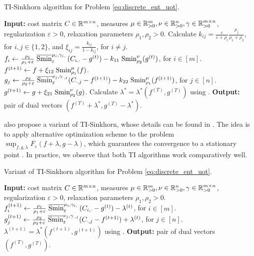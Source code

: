 \begin{algorithm}[t]
  \caption{TI-Sinkhorn algorithm for Problem \ref{eq:discrete_ent_uot}.}
  \label{alg:TI_Sinkhorn}
\begin{algorithmic}[1]
  \STATE \textbf{Input:} cost matrix $C \in \mathbb R^{m \times n}$,
  measures $\mu \in \mathbb R^m_{> 0}, \nu \in \mathbb R^n_{> 0}, \gamma \in \mathbb R^{m \times n}_{> 0}$,
  regularization $\varepsilon > 0$, relaxation parameters $\rho_1, \rho_2 > 0$.
  \STATE Calculate $k_{ij} = \frac{\varepsilon}{\varepsilon + \rho_i} \frac{\rho_j}{\rho_1 + \rho_2}$,
  for $i, j \in \{ 1, 2\}$, and $\xi_{ij} = \frac{k_{ij}}{1 - k_{ij}}$, for $i \neq j$.
  \STATE $f_i \gets \frac{\rho_1}{\rho_1 + \varepsilon} \; \overline{\text{Smin}}^{\mu_i, \gamma_{i, \cdot}}_{\varepsilon}(C_{i, \cdot} - g^{(t)})
  - k_{11} \; \text{Smin}^{\nu}_{\rho_2}(g^{(t)})$, for $i \in [m]$.
  \STATE $f^{(t+1)} \gets f + \xi_{12} \; \text{Smin}^{\mu}_{\rho_1}(f)$.
  \STATE $g_j \gets \frac{\rho_2}{\rho_2 + \varepsilon} \; \overline{\text{Smin}}^{\nu_j, \gamma_{\cdot, j}}_{\varepsilon}(C_{\cdot, j} - f^{(t+1)})
  - k_{22} \; \text{Smin}^{\mu}_{\rho_1}(f^{(t+1)})$, for $j \in [n]$.
  \STATE $g^{(t+1)} \gets g + \xi_{21} \; \text{Smin}^{\nu}_{\rho_2}(g)$.
  \ENDFOR
  \STATE Calculate $\lambda^* = \lambda^*(f^{(T)}, g^{(T)})$ using .
  \STATE \textbf{Output:} pair of dual vectors $(f^{(T)} + \lambda^*, g^{(T)} - \lambda^*)$.
\end{algorithmic}
\end{algorithm}

\cite{Sejourne21} also propose a variant of TI-Sinkhorn, whose details can be found in
. The idea is to apply alternative optimization scheme to the problem
$\sup_{f, g, \lambda} F_{\varepsilon}(f + \lambda, g - \lambda)$, which guarantees
the convergence to a stationary point \citep{Tseng01}. In practice,
we observe that both TI algorithms work comparatively well.
\begin{algorithm}[t]
  \caption{Variant of TI-Sinkhorn algorithm for Problem \ref{eq:discrete_ent_uot}.}
  \label{alg:TI_Sinkhorn_variant}
\begin{algorithmic}[1]
  \STATE \textbf{Input:} cost matrix $C \in \mathbb R^{m \times n}$,
  measures $\mu \in \mathbb R^m_{> 0}, \nu \in \mathbb R^n_{> 0}, \gamma \in \mathbb R^{m \times n}_{> 0}$,
  regularization $\varepsilon > 0$, relaxation parameters $\rho_1, \rho_2 > 0$.
  \STATE $f_i^{(t+1)} \gets \frac{\rho_1}{\rho_1 + \varepsilon} \; \overline{\text{Smin}}^{\mu_i, \gamma_{i, \cdot}}_{\varepsilon}(C_{i, \cdot} - g^{(t)})
  - \lambda^{(t)}$, for $i \in [m]$.
  \STATE $g_j^{(t+1)} \gets \frac{\rho_2}{\rho_2 + \varepsilon} \; \overline{\text{Smin}}^{\nu_j, \gamma_{\cdot, j}}_{\varepsilon}(C_{\cdot, j} - f^{(t+1)})
  + \lambda^{(t)}$, for $j \in [n]$.
  \STATE $\lambda^{(t+1)} = \lambda^*(f^{(t+1)}, g^{(t+1)})$ using .
  \ENDFOR
  \STATE \textbf{Output:} pair of dual vectors $(f^{(T)}, g^{(T)})$.
\end{algorithmic}
\end{algorithm}

